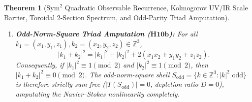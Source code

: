 \documentclass[11pt,a4paper]{article}
\newtheorem{theorem}{Theorem}[section]
\theoremstyle{definition}
\theoremstyle{remark}
\begin{document}
\begin{theorem}[$\mathrm{Sym}^2$ Quadratic Observable Recurrence, Kolmogorov UV/IR Scale Barrier, Toroidal $2$-Section Spectrum, and Odd-Parity Triad Amputation]
\begin{enumerate}
\begin{equation}\label{eq:torus_matrix}
A = 6(J - I) - 2P,
\end{equation}
where $J$ is the $n \times n$ all-ones matrix and $P_{u,v} = \delta_{v,-u}$ is the antipodal mode-reversal involution. Consequently, every vertex has degree $d(n) = 6(n-2)+4 = 6n-8 > 0$, the adjacency eigenvalues are $\{6n-8, -8, -4\}$, and the normalized Laplacian $L_{\mathrm{norm}} = I - \frac{1}{d(n)}A$ has exact spectrum
\begin{equation}\label{eq:torus_lap_spec}
\mathrm{Spec}(L_{\mathrm{norm}}) = \left\{0,\; \frac{6n}{6n-8},\; \frac{6n-4}{6n-8}\right\},
\end{equation}
with odd-sector eigenvalue $\gamma_{\mathrm{odd}}(n) = \frac{6n-4}{6n-8} > 1$ converging to $\gamma_\infty = 1$ as $n \to \infty$.
\item \textbf{Odd-Norm-Square Triad Amputation ($\mathbf{H10b}$):} For all $k_1 = (x_1,y_1,z_1), k_2 = (x_2,y_2,z_2) \in \mathbb{Z}^3$,
\begin{equation}\label{eq:parity_id}
|k_1 + k_2|^2 = |k_1|^2 + |k_2|^2 + 2(x_1 x_2 + y_1 y_2 + z_1 z_2).
\end{equation}
Consequently, if $|k_1|^2 \equiv 1 \pmod 2$ and $|k_2|^2 \equiv 1 \pmod 2$, then $|k_1 + k_2|^2 \equiv 0 \pmod 2$. The odd-norm-square shell $S_{\mathrm{odd}} = \{k \in \mathbb{Z}^3 : |k|^2 \text{ odd}\}$ is therefore strictly sum-free ($|T(S_{\mathrm{odd}})| = 0$, depletion ratio $D = 0$), amputating the Navier--Stokes nonlinearity completely.
\end{enumerate}
\end{theorem}
\end{document}
